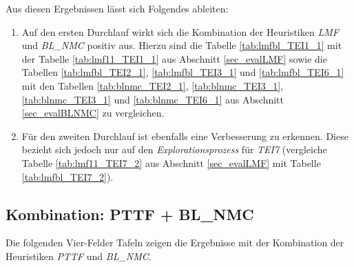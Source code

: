 \begin{multicols}{2}
\columnbreak
{}
\end{multicols}

\begin{multicols}{2}
\columnbreak
{}
\end{multicols}

\begin{multicols}{2}
\columnbreak
{}
\end{multicols}
\noindent
Aus diesen Ergebnissen lässt sich Folgendes ableiten:
\begin{enumerate}
\item Auf den ersten Durchlauf wirkt sich die Kombination der \Gls{Heuristik}en \emph{LMF} und \emph{BL\_NMC} positiv aus. Hierzu sind die Tabelle \ref{tab:lmfbl_TEI1_1} mit der Tabelle \ref{tab:lmf11_TEI1_1} aus Abschnitt \ref{sec_evalLMF} sowie die Tabellen \ref{tab:lmfbl_TEI2_1}, \ref{tab:lmfbl_TEI3_1} und \ref{tab:lmfbl_TEI6_1} mit den Tabellen \ref{tab:blnmc_TEI2_1}, \ref{tab:blnmc_TEI3_1}, \ref{tab:blnmc_TEI3_1} und \ref{tab:blnmc_TEI6_1} aus Abschnitt \ref{sec_evalBLNMC} zu vergleichen.

\item Für den zweiten Durchlauf ist ebenfalls eine Verbesserung zu erkennen. Diese bezieht sich jedoch nur auf den \emph{Explorationsprozess} für \emph{TEI7} (vergleiche Tabelle \ref{tab:lmf11_TEI7_2} aus Abschnitt \ref{sec_evalLMF} mit Tabelle \ref{tab:lmfbl_TEI7_2}).
\end{enumerate}

\subsection{Kombination: PTTF + BL\_NMC}\label{sec_evalPTTFBLNMC}
Die folgenden Vier-Felder Tafeln zeigen die Ergebnisse mit der Kombination der \Gls{Heuristik}en \emph{PTTF} und \emph{BL\_NMC}.
\begin{multicols}{3}
\columnbreak
{}\columnbreak
{}
\end{multicols}

